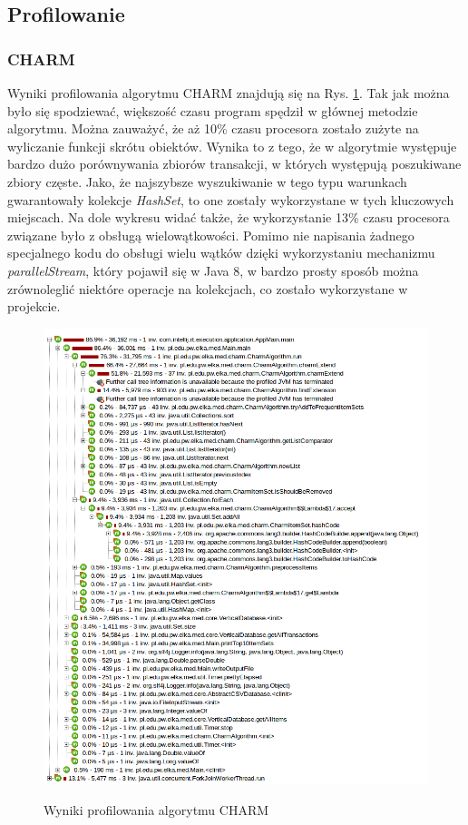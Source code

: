 \subsection{Profilowanie}

\subsubsection{CHARM}

Wyniki profilowania algorytmu CHARM znajdują się na Rys. \ref{charm:profil}. Tak jak można było się spodziewać, większość czasu program spędził w głównej metodzie algorytmu. Można zauważyć, że aż 10\% czasu procesora zostało zużyte na wyliczanie funkcji skrótu obiektów. Wynika to z tego, że w algorytmie występuje bardzo dużo porównywania zbiorów transakcji, w których występują poszukiwane zbiory częste. Jako, że najszybsze wyszukiwanie w tego typu warunkach gwarantowały kolekcje \emph{HashSet}, to one zostały wykorzystane w tych kluczowych miejscach. Na dole wykresu widać także, że wykorzystanie 13\% czasu procesora związane było z obsługą wielowątkowości. Pomimo nie napisania żadnego specjalnego kodu do obsługi wielu wątków dzięki wykorzystaniu mechanizmu \emph{parallelStream}, który pojawił się w Java 8, w bardzo prosty sposób można zrównoleglić niektóre operacje na kolekcjach, co zostało wykorzystane w projekcie.

\begin{figure}
\caption{Wyniki profilowania algorytmu CHARM}
\includegraphics[width=17cm]{res/charm-profi.png}
\label{charm:profil}
\end{figure}

